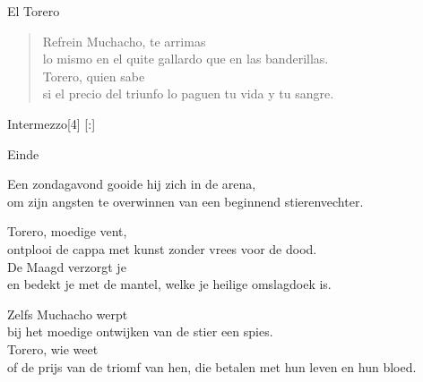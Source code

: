 \begin{song}{El Torero}
\begin{verse}{Refrein}
Muchacho, te arrimas\\
lo mismo en el quite gallardo que en las banderillas.\\
Torero,  quien sabe \\
si el precio del triunfo lo paguen tu vida y tu sangre.
\end{verse}

\begin{instrumental}{Intermezzo}[4]
   [:]
 
\end{instrumental}


\begin{instrumental}{Einde}
 
\end{instrumental}
\end{song}


\begin{translation}
Een zondagavond gooide hij zich in de arena,\\
om zijn angsten te overwinnen van een beginnend stierenvechter.\vspace{\wlskip}

Torero, moedige vent,\\
ontplooi de cappa met kunst zonder vrees voor de dood.\\
De Maagd verzorgt je\\
en bedekt je met de mantel, welke je heilige omslagdoek is.\vspace{\wlskip}

Zelfs Muchacho werpt\\
bij het moedige ontwijken van de stier een spies.\\
Torero, wie weet\\
of de prijs van de triomf van hen, die betalen met hun leven en hun
bloed.
\end{translation}
